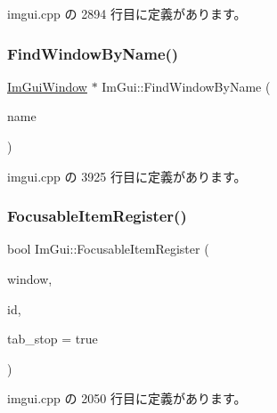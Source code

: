  imgui.\+cpp の 2894 行目に定義があります。

\mbox{\label{namespace_im_gui_abca25f22c02e73d5eb2e9c72c4557813}} 
\subsubsection{\texorpdfstring{Find\+Window\+By\+Name()}{FindWindowByName()}}
{\footnotesize\ttfamily \mbox{\hyperlink{struct_im_gui_window}{Im\+Gui\+Window}} $\ast$ Im\+Gui\+::\+Find\+Window\+By\+Name (\begin{DoxyParamCaption}\item[{const char $\ast$}]{name }\end{DoxyParamCaption})}



 imgui.\+cpp の 3925 行目に定義があります。

\mbox{\label{namespace_im_gui_ab1e2f7069edbab669b56e93e30930c45}} 
\subsubsection{\texorpdfstring{Focusable\+Item\+Register()}{FocusableItemRegister()}}
{\footnotesize\ttfamily bool Im\+Gui\+::\+Focusable\+Item\+Register (\begin{DoxyParamCaption}\item[{\mbox{\hyperlink{struct_im_gui_window}{Im\+Gui\+Window}} $\ast$}]{window,  }\item[{\mbox{\hyperlink{imgui_8h_a1785c9b6f4e16406764a85f32582236f}{Im\+Gui\+ID}}}]{id,  }\item[{bool}]{tab\+\_\+stop = {\ttfamily true} }\end{DoxyParamCaption})}



 imgui.\+cpp の 2050 行目に定義があります。

\mbox{\label{namespace_im_gui_a390518fcaef04b4d399d2475d4d84df7}} 
